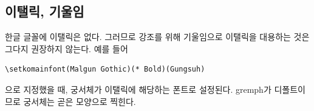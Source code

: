 \documentclass[
	12pt,
	a4paper,
	kosection,
	footnote,
	microtype,
	figtabcapt,
]{oblivoir}
\def\oblivoirdblquote#1{``#1''}
\newcommand\xobclass{x\-ob\-liv\-oir\oblivoirallowbreak}
\begin{document}
%
%
%
%

\subsection{이탤릭, 기울임}

한글 글꼴에 이탤릭은 없다. 그러므로 강조를 위해 기울임으로 이탤릭을 대용하는 것은 그다지 권장하지 않는다. 예를 들어 
\begin{verbatim}
\setkomainfont(Malgun Gothic)(* Bold)(Gungsuh)
\end{verbatim}
으로 지정했을 때, 궁서체가 이탤릭에 해당하는 폰트로 설정된다. gremph가 디폴트이므로 궁서체는 곧은 모양으로 찍힌다.
\end{document}
